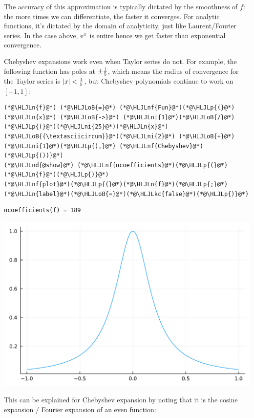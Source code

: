 \documentclass[12pt,a4paper]{article}
\newcommand{\HLJLkc}[1]{\textcolor[RGB]{59,151,46}{\textit{#1}}}
\newcommand{\HLJLn}[1]{#1}
\newcommand{\HLJLnd}[1]{\textcolor[RGB]{214,102,97}{#1}}
\newcommand{\HLJLnf}[1]{\textcolor[RGB]{66,102,213}{#1}}
\newcommand{\HLJLni}[1]{\textcolor[RGB]{59,151,46}{#1}}
\newcommand{\HLJLoB}[1]{\textcolor[RGB]{102,102,102}{\textbf{#1}}}
\newcommand{\HLJLp}[1]{#1}
\begin{document}
The accuracy of this approximation is typically dictated by the smoothness of $f$: the more times we can differentiate, the faster it converges. For analytic functions, it's dictated by the domain of analyticity, just like Laurent/Fourier series. In the case above, ${\rm e}^x$ is entire hence we get faster than exponential convergence.

Chebyshev expansions work even when Taylor series do not. For example, the following function has poles at $\pm {{\rm i} \over 5}$, which means the radius of convergence for the Taylor series is $|x| < {1 \over 5}$, but Chebyshev polynomials continue to work on $[-1,1]$:


\begin{lstlisting}
(*@\HLJLn{f}@*) (*@\HLJLoB{=}@*) (*@\HLJLnf{Fun}@*)(*@\HLJLp{(}@*) (*@\HLJLn{x}@*) (*@\HLJLoB{->}@*) (*@\HLJLni{1}@*)(*@\HLJLoB{/}@*)(*@\HLJLp{(}@*)(*@\HLJLni{25}@*)(*@\HLJLn{x}@*)(*@\HLJLoB{{\textasciicircum}}@*)(*@\HLJLni{2}@*) (*@\HLJLoB{+}@*) (*@\HLJLni{1}@*)(*@\HLJLp{),}@*) (*@\HLJLnf{Chebyshev}@*)(*@\HLJLp{())}@*)
(*@\HLJLnd{@show}@*) (*@\HLJLnf{ncoefficients}@*)(*@\HLJLp{(}@*)(*@\HLJLn{f}@*)(*@\HLJLp{)}@*)
(*@\HLJLnf{plot}@*)(*@\HLJLp{(}@*)(*@\HLJLn{f}@*)(*@\HLJLp{;}@*)(*@\HLJLn{label}@*)(*@\HLJLoB{=}@*)(*@\HLJLkc{false}@*)(*@\HLJLp{)}@*)
\end{lstlisting}

\begin{lstlisting}
ncoefficients(f) = 189
\end{lstlisting}

\includegraphics[width=\linewidth]{jl_hpkPoK/OP_methods_test_24_1.pdf}

This can be explained for Chebyshev expansion by noting that it is the cosine expansion / Fourier expansion of an even function:
\end{document}
